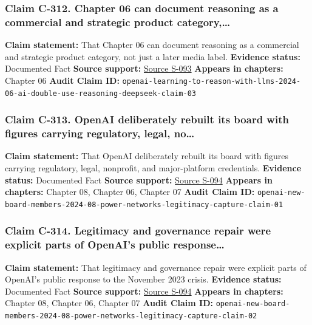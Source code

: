 \documentclass[
  american,
  11pt,
  letterpaper,
]{article}
\begin{document}
\subsubsection{Claim C-312. Chapter 06 can document reasoning as a
commercial and strategic product
category,\ldots{}}\label{claim-c-312-chapter-06-can-document-reasoning-as-a-commercial-and-strategic-product-category}

\textbf{Claim statement:} That Chapter 06 can document reasoning as a
commercial and strategic product category, not just a later media label.
\textbf{Evidence status:} Documented Fact \textbf{Source support:}
\hyperref[source-s-093-learning-to-reason-with-llms]{Source S-093}
\textbf{Appears in chapters:} Chapter 06 \textbf{Audit Claim ID:}
\texttt{openai-learning-to-reason-with-llms-2024-06-ai-double-use-reasoning-deepseek-claim-03}

\subsubsection{Claim C-313. OpenAI deliberately rebuilt its board with
figures carrying regulatory, legal,
no\ldots{}}\label{claim-c-313-openai-deliberately-rebuilt-its-board-with-figures-carrying-regulatory-legal-no}

\textbf{Claim statement:} That OpenAI deliberately rebuilt its board
with figures carrying regulatory, legal, nonprofit, and major-platform
credentials. \textbf{Evidence status:} Documented Fact \textbf{Source
support:}
\hyperref[source-s-094-openai-announces-new-members-to-board-of-directors]{Source
S-094} \textbf{Appears in chapters:} Chapter 08, Chapter 06, Chapter 07
\textbf{Audit Claim ID:}
\texttt{openai-new-board-members-2024-08-power-networks-legitimacy-capture-claim-01}

\subsubsection{Claim C-314. Legitimacy and governance repair were
explicit parts of OpenAI's public
response\ldots{}}\label{claim-c-314-legitimacy-and-governance-repair-were-explicit-parts-of-openai-s-public-response}

\textbf{Claim statement:} That legitimacy and governance repair were
explicit parts of OpenAI's public response to the November 2023 crisis.
\textbf{Evidence status:} Documented Fact \textbf{Source support:}
\hyperref[source-s-094-openai-announces-new-members-to-board-of-directors]{Source
S-094} \textbf{Appears in chapters:} Chapter 08, Chapter 06, Chapter 07
\textbf{Audit Claim ID:}
\texttt{openai-new-board-members-2024-08-power-networks-legitimacy-capture-claim-02}
\end{document}
